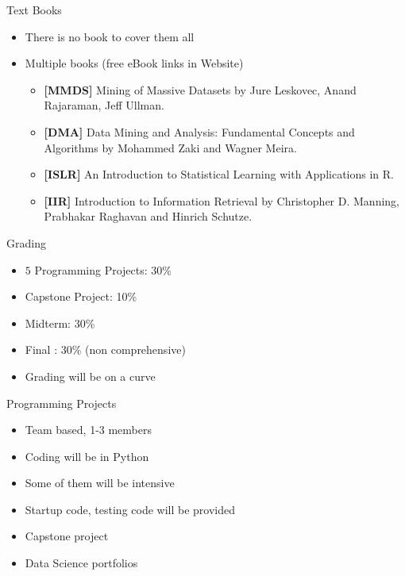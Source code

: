 \documentclass{beamer}
\begin{document}
\begin{frame}{Text Books}
    \begin{itemize}
        \item There is no book to cover them all 
        \item Multiple books (free eBook links in Website)
        \begin{itemize}
            \item {\bf [MMDS]} Mining of Massive Datasets by Jure Leskovec, Anand Rajaraman, Jeff Ullman.
            \item {\bf [DMA]} Data Mining and Analysis: Fundamental Concepts and Algorithms by Mohammed Zaki and Wagner Meira.
            \item {\bf [ISLR]} An Introduction to Statistical Learning with Applications in R. 
            \item {\bf [IIR]} Introduction to Information Retrieval by Christopher D. Manning, Prabhakar Raghavan and Hinrich Schutze.
        \end{itemize}
    \end{itemize}
\end{frame}


\begin{frame}{Grading}
    \begin{itemize}
        \item $5$ Programming Projects: 30\%
        \item Capstone Project: 10\%
        \item Midterm: 30\%
        \item Final : 30\% (non comprehensive)
        \item Grading will be on a curve
    \end{itemize}
\end{frame}


\begin{frame}{Programming Projects}
    \begin{itemize}
        \item Team based, 1-3 members
        \item Coding will be in Python
        \item Some of them will be intensive
        \item Startup code, testing code will be provided
        \item Capstone project
        \item Data Science portfolios
    \end{itemize}
\end{frame}
\end{document}
